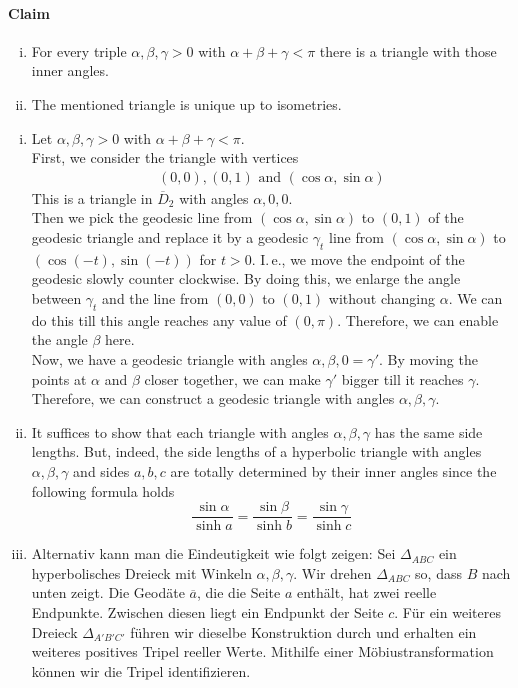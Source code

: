 \documentclass{book}
\renewcommand{\l}[1]{\overline{#1}}
\begin{document}
\paragraph{Claim}
\begin{enumerate}[(i)]
	\item For every triple $\alpha, \beta, \gamma > 0$ with $\alpha + \beta + \gamma < \pi$ there is a triangle with those inner angles.
	\item The mentioned triangle is unique up to isometries.
\end{enumerate}
\begin{Beweis}{}
	\begin{enumerate}[(i)]
		\item Let $\alpha, \beta, \gamma > 0$ with $\alpha + \beta + \gamma < \pi$.\\
		First, we consider the triangle with vertices
		\begin{align*}
		\left(0,0\right), \left(0,1\right) \text{ and } \left( \cos \alpha, \sin \alpha \right)
		\end{align*}
		This is a triangle in $\l{D}_2$ with angles $\alpha, 0, 0$.\\
		Then we pick the geodesic line from $\left( \cos \alpha, \sin \alpha \right)$ to $\left(0,1\right)$ of the geodesic triangle and replace it by a geodesic $\gamma_t$ line from $\left( \cos \alpha, \sin \alpha \right)$ to $\left( \cos (-t), \sin (-t) \right)$ for $t > 0$. I.\,e., we move the endpoint of the geodesic slowly counter clockwise. By doing this, we enlarge the angle between $\gamma_t$ and the line from $(0,0)$ to $(0,1)$ without changing $\alpha$. We can do this till this angle reaches any value of $(0,\pi )$. Therefore, we can enable the angle $\beta$ here.\\
		Now, we have a geodesic triangle with angles $\alpha, \beta, 0 = \gamma'$. By moving the points at $\alpha$ and $\beta$ closer together, we can make $\gamma'$ bigger till it reaches $\gamma$. Therefore, we can construct a geodesic triangle with angles $\alpha, \beta, \gamma$.
		\item It suffices to show that each triangle with angles $\alpha, \beta, \gamma$ has the same side lengths. But, indeed, the side lengths of a hyperbolic triangle with angles $\alpha, \beta, \gamma$ and sides $a,b,c$ are totally determined by their inner angles since the following formula holds
		\[ \frac{\sin \alpha}{\sinh a} = \frac{\sin \beta}{\sinh b} = \frac{\sin \gamma}{\sinh c}  \]
		\item Alternativ kann man die Eindeutigkeit wie folgt zeigen: Sei $\Delta_{ABC}$ ein hyperbolisches Dreieck mit Winkeln $\alpha, \beta, \gamma$. Wir drehen $\Delta_{ABC}$ so, dass $B$ nach unten zeigt. Die Geodäte $\overline{ a}$, die die Seite $a$ enthält, hat zwei reelle Endpunkte. Zwischen diesen liegt ein Endpunkt der Seite $c$. Für ein weiteres Dreieck $\Delta_{A'B'C'}$ führen wir dieselbe Konstruktion durch und erhalten ein weiteres positives Tripel reeller Werte. Mithilfe einer Möbiustransformation können wir die Tripel identifizieren.\\

\end{enumerate}
\end{Beweis}
\end{document}
